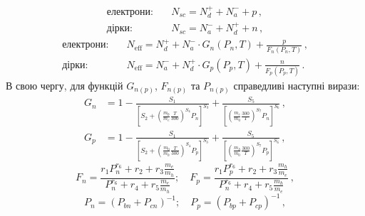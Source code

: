\documentclass[12pt,a4paper,titlepage,oneside]{book}
\numberwithin{equation}{part}
\begin{document}
\begin{subequations} \label{eqK4}
    \begin{align}
       \text{електрони:} \quad& N_{sc} =N_d^+ + N_a^-+ p\,, \label{eqK4a} \\
        \text{дірки:} \quad& N_{sc}= N_a^-+N_d^++n\,, \label{eqK4b}
    \end{align}
\end{subequations}
\begin{subequations} \label{eqK5}
    \begin{align}
       \text{електрони:} \quad& N_\mathrm{eff} =N_d^+ + N_a^- \cdot G_n(P_n,T) +\frac{p}{F_n(P_n,T)}\,, \label{eqK5a} \\
        \text{дірки:} \quad& N_\mathrm{eff}= N_a^- + N_d^+ \cdot G_p(P_p,T) +\frac{n}{F_p(P_p,T)}\,. \label{eqK5b}
    \end{align}
\end{subequations}
В свою чергу, для функцій $G_{n(p)}$, $F_{n(p)}$  та $P_{n(p)}$ справедливі наступні вирази:
\begin{subequations} \label{eqK6}
    \begin{align}
       G_n& = 1 - \frac{S_1}{\left[S_2 + \left( \frac{m_0}{m_e} \frac{T}{300} \right)^{S_4} P_n\right]^{S_3}}
       + \frac{S_5}{\left[ \left(\frac{m_e}{m_0} \frac{300}{T}\right)^{S_7} P_n\right]^{S_6}}\,, \label{eqK6a} \\
       G_p& = 1 - \frac{S_1}{\left[S_2 + \left( \frac{m_0}{m_h} \frac{T}{300} \right)^{S_4} P_p\right]^{S_3}}
       + \frac{S_5}{\left[ \left(\frac{m_h}{m_0} \frac{300}{T}\right)^{S_7} P_p\right]^{S_6}}\,, \label{eqK6b}
    \end{align}
\end{subequations}
\begin{equation}\label{eqK7}
 F_n = \frac{r_1  P_n^{r_6} + r_2 + r_3  \frac{m_e}{m_h}}{P_n^{r_6} + r_4 + r_5 \frac{m_e}{m_h}}; \quad
 F_p = \frac{r_1  P_p^{r_6} + r_2 + r_3  \frac{m_h}{m_e}}{P_n^{r_6} + r_4 + r_5 \frac{m_h}{m_e}}\,,
\end{equation}
\begin{equation}\label{eqK8}
  P_n = \left(P_{bn}+P_{cn}\right)^{-1}; \quad
  P_p = \left(P_{bp}+P_{cp}\right)^{-1}\,,
\end{equation}
\end{document}
